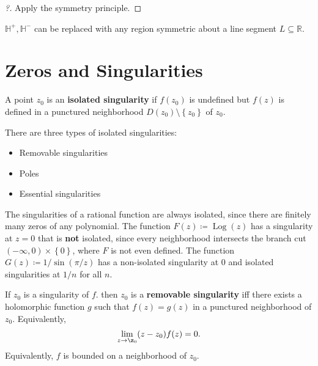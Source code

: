 \begin{proof}[?]

Apply the symmetry principle.

\end{proof}

\begin{remark}

\({\mathbb{H}}^+, {\mathbb{H}}^-\) can be replaced with any region
symmetric about a line segment \(L\subseteq {\mathbb{R}}\).

\end{remark}

\hypertarget{zeros-and-singularities}{%
\section{Zeros and Singularities}\label{zeros-and-singularities}}

\begin{definition}[Singularity]

A point \(z_0\) is an \textbf{isolated singularity} if \(f(z_0)\) is
undefined but \(f(z)\) is defined in a punctured neighborhood
\(D(z_0)\setminus\left\{{z_0}\right\}\) of \(z_0\).

There are three types of isolated singularities:

\begin{itemize}
\tightlist
\item
  Removable singularities
\item
  Poles
\item
  Essential singularities
\end{itemize}

\end{definition}

\begin{example}[?]

The singularities of a rational function are always isolated, since
there are finitely many zeros of any polynomial. The function
\(F(z) \coloneqq\operatorname{Log}(z)\) has a singularity at \(z=0\)
that is \textbf{not} isolated, since every neighborhood intersects the
branch cut \((-\infty, 0) \times\left\{{ 0 }\right\}\), where \(F\) is
not even defined. The function \(G(z) \coloneqq 1/\sin(\pi/z)\) has a
non-isolated singularity at 0 and isolated singularities at \(1/n\) for
all \(n\).

\end{example}

\begin{definition}

If \(z_0\) is a singularity of \(f\). then \(z_0\) is a
\textbf{removable singularity} iff there exists a holomorphic function
\(g\) such that \(f(z) = g(z)\) in a punctured neighborhood of \(z_0\).
Equivalently,
\begin{align*}
\lim_{z\to \z_0}(z-z_0) f(z) = 0
.\end{align*}
Equivalently, \(f\) is bounded on a neighborhood of \(z_0\).

\end{definition}

